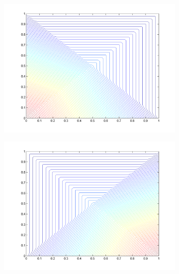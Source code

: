 \pagebreak
\begin{figure}
\label{fig::2D_PWL_unit_square_basis_functions}
\centering
	\begin{subfigure}[b]{0.48\textwidth}
		\centering
		\includegraphics[width=\textwidth]{figures/sec_BF/PWL_square_contour_1.png}
		\caption{}
	\end{subfigure}
	\hfill
	\begin{subfigure}[b]{0.48\textwidth}
		\centering
		\includegraphics[width=\textwidth]{figures/sec_BF/PWL_square_contour_2.png}
		\caption{}
	\end{subfigure}
	\vfill
	\begin{subfigure}[b]{0.48\textwidth}

\end{subfigure}
\end{figure}
